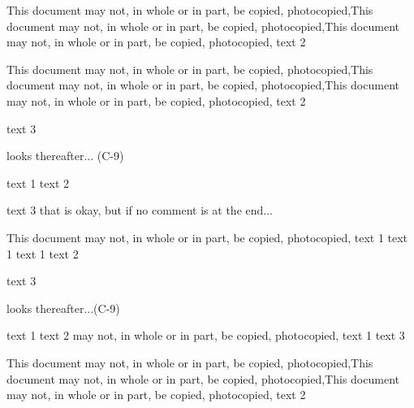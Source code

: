 This document may not, in whole or in part, be copied, photocopied,This document may not, in whole or in part, be copied, photocopied,This document
may not, in whole or in part, be copied, photocopied, text 2
%
%
%
%
%
%
% 
%
%
%
%
% 
% 
%

This  document  may  not, in  whole  or in  part, be  copied,  photocopied,This  document  may  not, in  whole  or in  part, be  copied,  photocopied,This  document  may  not, in  whole  or in  part, be  copied,  photocopied,
text 2

text 3

looks thereafter... (C-9)

text 1 text 2

text 3
 that is okay, but if no comment is at the end...


This document may not, in whole or in part, be copied, photocopied, text 1
text 1 text 1 text 2 %

text 3

looks thereafter...(C-9)

text 1 text 2 may not, in whole or in part, be copied, photocopied, text 1
text 3

This  document  may  not, in  whole  or in  part, be  copied,  photocopied,This  document  may  not, in  whole  or in  part, be  copied,  photocopied,This  document  may  not, in  whole  or in  part, be  copied,  photocopied,
text 2
